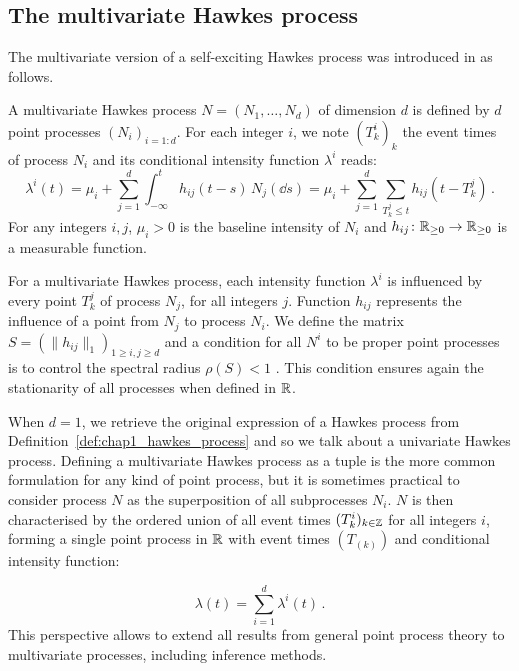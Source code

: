 
\subsection{The multivariate Hawkes process}

The multivariate version of a self-exciting Hawkes process was introduced in \textcite{Hawkes1971} as follows.

\begin{definition}\label{def:chap1_multivariate_hawkes}
    A multivariate Hawkes process $N = (N_1, \ldots, N_d)$ of dimension $d$ is defined by $d$ point processes $(N_i)_{i=1:d}$.
    For each integer $i$, we note $(T_k^i)_k$ the event times of process $N_i$ and its conditional intensity function $\lambda^i$ reads:
    \[\lambda^i(t) = \mu_i + \sum_{j=1}^{d}\int_{-\infty}^{t}{h_{ij}(t-s)}\,N_j(\dd s) = \mu_i + \sum_{j=1}^{d}\sum_{T_k^j \leq t}{h_{ij}(t-T_k^j)}\,.\]
    For any integers $i, j$, $\mu_i>0$ is the baseline intensity of $N_i$ and $h_{ij}\colon{\mathbb R}_{\geq 0}\to {\mathbb R}_{\geq 0}$ is a measurable function.
\end{definition}
For a multivariate Hawkes process, each intensity function $\lambda^i$ is influenced by every point $T_k^j$ of process $N_j$, for all integers $j$.
Function $h_{ij}$ represents the influence of a point from $N_j$ to process $N_i$. We define the matrix $S = (\|h_{ij}\|_1)_{1 \geq i,j \geq d}$ and a condition for all $N^i$ to be proper point processes is to control the spectral radius $\rho(S) < 1$ \parencite{Bacry2015}.
This condition ensures again the stationarity of all processes when defined in ${\mathbb R}$.

When $d=1$, we retrieve the original expression of a Hawkes process from Definition~\ref{def:chap1_hawkes_process} and so we talk about a univariate Hawkes process. 
Defining a multivariate Hawkes process as a tuple is the more common formulation for any kind of point process, but it is sometimes practical to consider process $N$ as the superposition of all subprocesses $N_i$.
$N$ is then characterised by the ordered union of all event times $(T_k^i)_{k\in{\mathbb Z}}$ for all integers $i$, forming a single point process in ${\mathbb R}$ with event times $(T_{(k)})$ and conditional intensity function:

\[\lambda(t) = \sum_{i=1}^{d}{\lambda^i(t)}\,.\]
This perspective allows to extend all results from general point process theory to multivariate processes, including inference methods.

